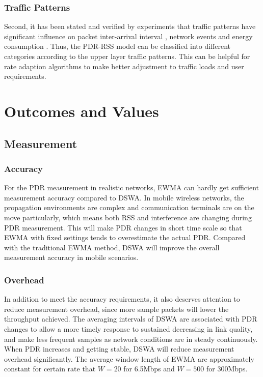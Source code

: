 \documentclass[draftclsnofoot,journal,onecolumn,11pt]{IEEEtran}
\begin{document}
\subsubsection{Traffic Patterns}
Second, it has been stated and verified by experiments that traffic patterns have significant influence on packet inter-arrival interval \cite{Han:2012:DPW:2307636.2307675}, network events \cite{Wei:2012:PMP:2348543.2348563} and energy consumption \cite{Mittal:2012:EDE:2348543.2348583}. Thus, the PDR-RSS model can be classified into different categories according to the upper layer traffic patterns. This can be helpful for rate adaption algorithms to make better adjustment to traffic loads and user requirements.

\section{Outcomes and Values}

\subsection{Measurement}
\subsubsection{Accuracy}
For the PDR measurement in realistic networks, EWMA can hardly get sufficient measurement accuracy compared to DSWA. In mobile wireless networks, the propagation environments are complex and communication terminals are on the move particularly, which means both RSS and interference are changing during PDR measurement. This will make PDR changes in short time scale so that EWMA with fixed settings tends to overestimate the actual PDR. Compared with the traditional EWMA method, DSWA will improve the overall measurement accuracy in mobile scenarios.

\subsubsection{Overhead}
In addition to meet the accuracy requirements, it also deserves attention to reduce measurement overhead, since more sample packets will lower the throughput achieved. The averaging intervals of DSWA are associated with PDR changes to allow a more timely response to sustained decreasing in link quality, and make less frequent samples as network conditions are in steady continuously. When PDR increases and getting stable, DSWA will reduce measurement overhead significantly. The average window length of EWMA are approximately constant for certain rate that $W=20$ for 6.5Mbps and $W=500$ for 300Mbps.
\end{document}
